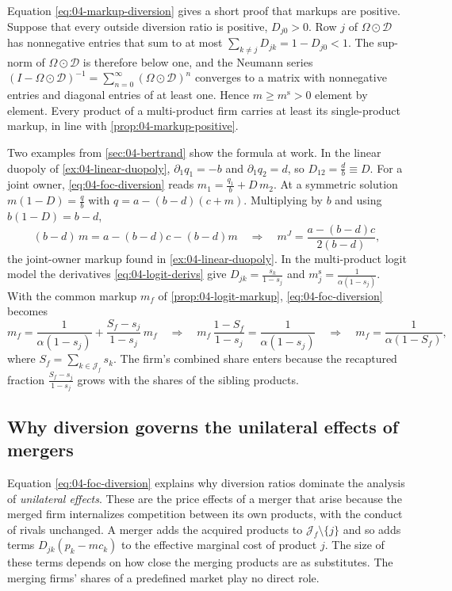 \begin{remark}\label{rem:04-diversion-positive}
Equation \eqref{eq:04-markup-diversion} gives a short proof that markups are positive. Suppose that every
outside diversion ratio is positive, $D_{j0} > 0$. Row $j$ of $\Omega\odot\mathcal{D}$ has nonnegative
entries that sum to at most $\sum_{k \neq j}D_{jk} = 1 - D_{j0} < 1$. The sup-norm of
$\Omega\odot\mathcal{D}$ is therefore below one, and the Neumann series
$(I - \Omega\odot\mathcal{D})^{-1} = \sum_{n=0}^\infty(\Omega\odot\mathcal{D})^n$ converges to a matrix with
nonnegative entries and diagonal entries of at least one. Hence $m \ge m^{\mathrm{s}} > 0$ element by element. Every product of a
multi-product firm carries at least its single-product markup, in line with \cref{prop:04-markup-positive}.
\end{remark}

Two examples from \cref{sec:04-bertrand} show the formula at work. In the linear duopoly of
\cref{ex:04-linear-duopoly}, $\partial_1 q_1 = -b$ and $\partial_1 q_2 = d$, so $D_{12} = \frac{d}{b} \equiv D$.
For a joint owner, \eqref{eq:04-foc-diversion} reads $m_1 = \frac{q_1}{b} + D\,m_2$. At a symmetric
solution $m(1 - D) = \frac{q}{b}$ with $q = a - (b - d)(c + m)$. Multiplying by $b$ and using
$b(1 - D) = b - d$,
\[
  (b - d)\,m = a - (b - d)c - (b - d)m \quad\Longrightarrow\quad m^J = \frac{a - (b - d)c}{2(b - d)},
\]
the joint-owner markup found in \cref{ex:04-linear-duopoly}. In the multi-product logit model the
derivatives \eqref{eq:04-logit-derivs} give $D_{jk} = \frac{s_k}{1 - s_j}$ and
$m^{\mathrm{s}}_j = \frac{1}{\alpha(1 - s_j)}$. With the common markup $m_f$ of \cref{prop:04-logit-markup},
\eqref{eq:04-foc-diversion} becomes
\[
  m_f = \frac{1}{\alpha(1 - s_j)} + \frac{S_f - s_j}{1 - s_j}\,m_f
  \quad\Longrightarrow\quad m_f\,\frac{1 - S_f}{1 - s_j} = \frac{1}{\alpha(1 - s_j)}
  \quad\Longrightarrow\quad m_f = \frac{1}{\alpha(1 - S_f)},
\]
where $S_f = \sum_{k \in \mathcal{J}_f}s_k$. The firm's combined share enters because the recaptured
fraction $\frac{S_f - s_j}{1 - s_j}$ grows with the shares of the sibling products.

\subsection{Why diversion governs the unilateral effects of mergers}\label{sec:04-diversion-merger}

Equation \eqref{eq:04-foc-diversion} explains why diversion ratios dominate the analysis of
\emph{unilateral effects}. These are the price effects of a merger that arise because the merged firm
internalizes competition between its own products, with the conduct of rivals unchanged. A merger adds the
acquired products to $\mathcal{J}_f\setminus\{j\}$ and so adds terms $D_{jk}(p_k - mc_k)$ to the effective marginal
cost of product $j$. The size of these terms depends on how close the merging products are as substitutes. The
merging firms' shares of a predefined market play no direct role.

